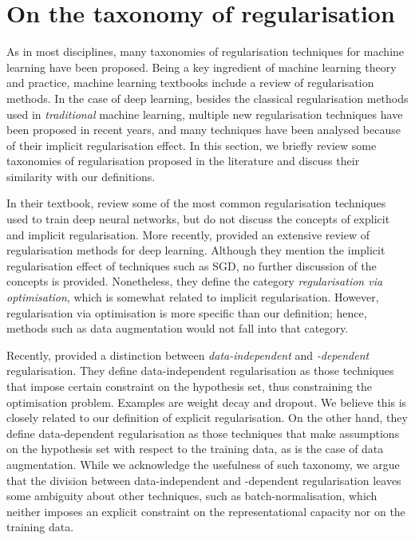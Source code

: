 {\section{On the taxonomy of regularisation}
\label{sec:reg-taxonomies}
As in most disciplines, many taxonomies of regularisation techniques for machine learning have been proposed. Being a key ingredient of machine learning theory and practice, machine learning textbooks include a review of regularisation methods. In the case of deep learning, besides the classical regularisation methods used in \textit{traditional} machine learning, multiple new regularisation techniques have been proposed in recent years, and many techniques have been analysed because of their implicit regularisation effect. In this section, we briefly review some taxonomies of regularisation proposed in the literature and discuss their similarity with our definitions. 

In their textbook, \citet{goodfellow2016dlbook} review some of the most common regularisation techniques used to train deep neural networks, but do not discuss the concepts of explicit and implicit regularisation. More recently, \citet{kukavcka2017regularization} provided an extensive review of regularisation methods for deep learning. Although they mention the implicit regularisation effect of techniques such as SGD, no further discussion of the concepts is provided. Nonetheless, they define the category \textit{regularisation via optimisation}, which is somewhat related to implicit regularisation. However, regularisation via optimisation is more specific than our definition; hence, methods such as data augmentation would not fall into that category.

Recently, \citet{guo2018mixup} provided a distinction between \textit{data-independent} and \textit{-dependent} regularisation. They define data-independent regularisation as those techniques that impose certain constraint on the hypothesis set, thus constraining the optimisation problem. Examples are weight decay and dropout. We believe this is closely related to our definition of explicit regularisation. On the other hand, they define data-dependent regularisation as those techniques that make assumptions on the hypothesis set with respect to the training data, as is the case of data augmentation. While we acknowledge the usefulness of such taxonomy, we argue that the division between data-independent and -dependent regularisation leaves some ambiguity about other techniques, such as batch-normalisation, which neither imposes an explicit constraint on the representational capacity nor on the training data. 

}
